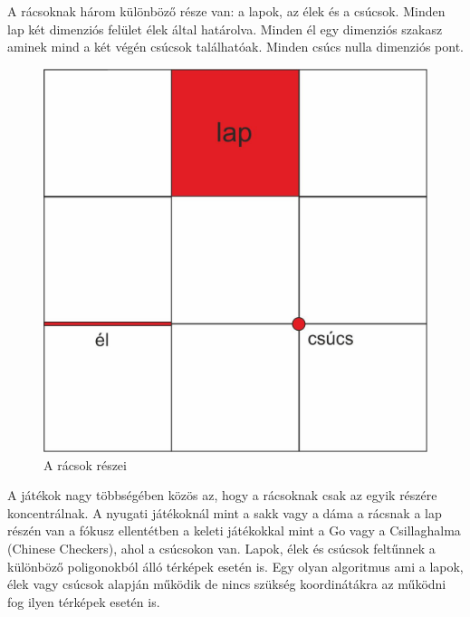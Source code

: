 A rácsoknak három különböző része van: a lapok, az élek és a csúcsok. Minden lap két dimenziós felület élek által határolva. Minden él egy dimenziós szakasz aminek mind a két végén csúcsok találhatóak. Minden csúcs nulla dimenziós pont. 

\begin{figure}[h!]
\centering
\includegraphics[scale=0.4]{kepek/PartsOfGrid.jpg}
\caption{A rácsok részei}
\label{fig:PartsOfGrid}
\end{figure}

\noindent A játékok nagy többségében közös az, hogy a rácsoknak csak az egyik részére koncentrálnak. A nyugati játékoknál mint a sakk vagy a dáma a rácsnak a lap részén van a fókusz ellentétben a keleti játékokkal mint a Go vagy a Csillaghalma (Chinese Checkers), ahol a csúcsokon van.
\newline
\newline Lapok, élek és csúcsok feltűnnek a különböző poligonokból álló  térképek esetén is. Egy olyan algoritmus ami a lapok, élek vagy csúcsok alapján működik de nincs szükség koordinátákra az működni fog ilyen térképek esetén is.

